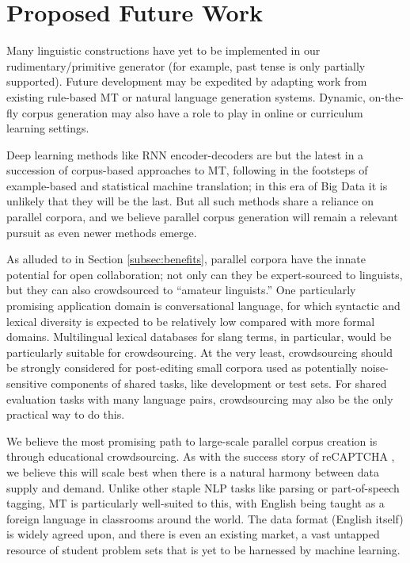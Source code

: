 
\section{Proposed Future Work}
\label{sec:future}


Many linguistic constructions have yet to be implemented in our rudimentary/primitive generator (for example, past tense is only partially supported).
Future development may be expedited by adapting work from existing rule-based MT or natural language generation systems. 
Dynamic, on-the-fly corpus generation may also have a role to play in online or curriculum learning settings.

Deep learning methods like RNN encoder-decoders  are but the latest in a succession of corpus-based approaches to MT, following in the footsteps of example-based and statistical machine translation; in this era of Big Data it is unlikely that they will be the last.
But all such methods share a reliance on parallel corpora, and we believe parallel corpus generation will remain a relevant pursuit as even newer methods emerge.

As alluded to in Section \ref{subsec:benefits}, parallel corpora have the innate potential for open collaboration; not only can they be expert-sourced to linguists, but they can also crowdsourced to ``amateur linguists.''
One particularly promising application domain is conversational language, for which syntactic and lexical diversity is expected to be relatively low compared with more formal domains. 
Multilingual lexical databases for slang terms, in particular, would be particularly suitable for crowdsourcing.
At the very least, crowdsourcing should be strongly considered for post-editing small corpora used as potentially noise-sensitive components of shared tasks, like development or test sets.
For shared evaluation tasks with many language pairs, crowdsourcing may also be the only practical way to do this.

We believe the most promising path to large-scale parallel corpus creation is through educational crowdsourcing.
As with the success story of reCAPTCHA , we believe this will scale best when there is a natural harmony between data supply and demand.
Unlike other staple NLP tasks like parsing or part-of-speech tagging, MT is particularly well-suited to this, with English being taught as a foreign language in classrooms around the world.
The data format (English itself) is widely agreed upon, and there is even an existing market, a vast untapped resource of student problem sets that is yet to be harnessed by machine learning.

